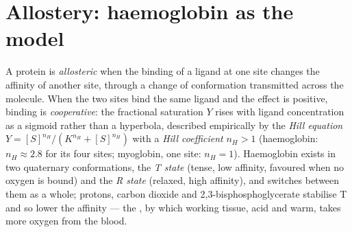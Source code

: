 \section{Allostery: haemoglobin as the model}

\begin{definition}\label{def:b3:structural-biology:allostery}
A protein is \emph{allosteric} when the binding of a ligand at one
site changes the affinity of another site, through a change of
conformation transmitted across the molecule. When the two sites bind
the same ligand and the effect is positive, binding is
\emph{cooperative}: the fractional saturation $Y$ rises with ligand
concentration as a sigmoid rather than a hyperbola, described
empirically by the \emph{Hill equation} $Y = [S]^{n_{H}}/(K^{n_{H}} +
[S]^{n_{H}})$ with a \emph{Hill coefficient} $n_{H} > 1$ (haemoglobin:
$n_{H} \approx 2.8$ for its four sites; myoglobin, one site: $n_{H} =
1$). Haemoglobin exists in two quaternary conformations, the
\emph{T state} (tense, low affinity, favoured when no oxygen is bound)
and the \emph{R state} (relaxed, high affinity), and switches between
them as a whole; protons, carbon dioxide and 2,3-bisphosphoglycerate
stabilise T and so lower the affinity --- the , by which
working tissue, acid and warm, takes more oxygen from the blood.
\end{definition}

